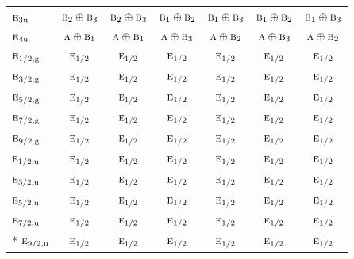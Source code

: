 \documentclass[10pt,a4paper]{article}
\numberwithin{equation}{section}
\newcommand{\irr}[1]{\text{\normalfont\scshape #1}}
\newcommand{\ptag}[1]{\mathrm{#1}}
\begin{document}
{\begin{longtable}{@{}lcccccc@{}}
$\irr{e}_{3\ptag{u}}$ & $\irr{b}_{2}\oplus \irr{b}_{3}$ & $\irr{b}_{2}\oplus \irr{b}_{3}$ & $\irr{b}_{1}\oplus \irr{b}_{2}$ & $\irr{b}_{1}\oplus \irr{b}_{3}$ & $\irr{b}_{1}\oplus \irr{b}_{2}$ & $\irr{b}_{1}\oplus \irr{b}_{3}$\\
$\irr{e}_{4\ptag{u}}$ & $\irr{a}\oplus \irr{b}_{1}$ & $\irr{a}\oplus \irr{b}_{1}$ & $\irr{a}\oplus \irr{b}_{3}$ & $\irr{a}\oplus \irr{b}_{2}$ & $\irr{a}\oplus \irr{b}_{3}$ & $\irr{a}\oplus \irr{b}_{2}$\\
$\irr{e}_{1/2,\ptag{g}}$ & $\irr{e}_{1/2}$ & $\irr{e}_{1/2}$ & $\irr{e}_{1/2}$ & $\irr{e}_{1/2}$ & $\irr{e}_{1/2}$ & $\irr{e}_{1/2}$\\
$\irr{e}_{3/2,\ptag{g}}$ & $\irr{e}_{1/2}$ & $\irr{e}_{1/2}$ & $\irr{e}_{1/2}$ & $\irr{e}_{1/2}$ & $\irr{e}_{1/2}$ & $\irr{e}_{1/2}$\\
$\irr{e}_{5/2,\ptag{g}}$ & $\irr{e}_{1/2}$ & $\irr{e}_{1/2}$ & $\irr{e}_{1/2}$ & $\irr{e}_{1/2}$ & $\irr{e}_{1/2}$ & $\irr{e}_{1/2}$\\
$\irr{e}_{7/2,\ptag{g}}$ & $\irr{e}_{1/2}$ & $\irr{e}_{1/2}$ & $\irr{e}_{1/2}$ & $\irr{e}_{1/2}$ & $\irr{e}_{1/2}$ & $\irr{e}_{1/2}$\\
$\irr{e}_{9/2,\ptag{g}}$ & $\irr{e}_{1/2}$ & $\irr{e}_{1/2}$ & $\irr{e}_{1/2}$ & $\irr{e}_{1/2}$ & $\irr{e}_{1/2}$ & $\irr{e}_{1/2}$\\
$\irr{e}_{1/2,\ptag{u}}$ & $\irr{e}_{1/2}$ & $\irr{e}_{1/2}$ & $\irr{e}_{1/2}$ & $\irr{e}_{1/2}$ & $\irr{e}_{1/2}$ & $\irr{e}_{1/2}$\\
$\irr{e}_{3/2,\ptag{u}}$ & $\irr{e}_{1/2}$ & $\irr{e}_{1/2}$ & $\irr{e}_{1/2}$ & $\irr{e}_{1/2}$ & $\irr{e}_{1/2}$ & $\irr{e}_{1/2}$\\
$\irr{e}_{5/2,\ptag{u}}$ & $\irr{e}_{1/2}$ & $\irr{e}_{1/2}$ & $\irr{e}_{1/2}$ & $\irr{e}_{1/2}$ & $\irr{e}_{1/2}$ & $\irr{e}_{1/2}$\\
$\irr{e}_{7/2,\ptag{u}}$ & $\irr{e}_{1/2}$ & $\irr{e}_{1/2}$ & $\irr{e}_{1/2}$ & $\irr{e}_{1/2}$ & $\irr{e}_{1/2}$ & $\irr{e}_{1/2}$\\*
$\irr{e}_{9/2,\ptag{u}}$ & $\irr{e}_{1/2}$ & $\irr{e}_{1/2}$ & $\irr{e}_{1/2}$ & $\irr{e}_{1/2}$ & $\irr{e}_{1/2}$ & $\irr{e}_{1/2}$\\
\bottomrule\end{longtable}}
\end{document}
